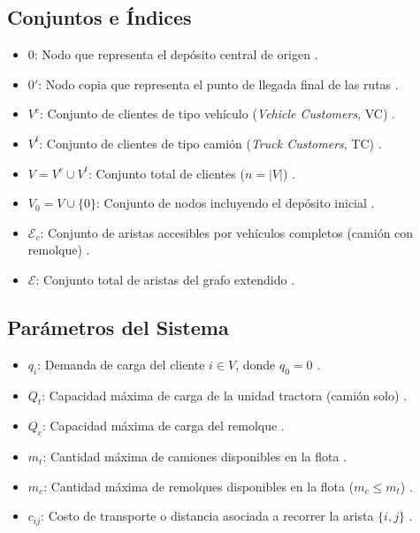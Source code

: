 \documentclass[letter, 10pt]{article}
\begin{document}
\subsection{Conjuntos e \'Indices}
\begin{itemize}
    \item $0$: Nodo que representa el dep\'osito central de origen \cite{bartolini2020two}.
    \item $0'$: Nodo copia que representa el punto de llegada final de las rutas \cite{bartolini2020two}.
    \item $V^c$: Conjunto de clientes de tipo veh\'iculo (\textit{Vehicle Customers}, VC) \cite{bartolini2020two}.
    \item $V^t$: Conjunto de clientes de tipo cami\'on (\textit{Truck Customers}, TC) \cite{bartolini2020two}.
    \item $V = V^c \cup V^t$: Conjunto total de clientes ($n = |V|$) \cite{bartolini2020two}.
    \item $V_0 = V \cup \{0\}$: Conjunto de nodos incluyendo el dep\'osito inicial \cite{bartolini2020two}.
    \item $\mathcal{E}_c$: Conjunto de aristas accesibles por veh\'iculos completos (cami\'on con remolque) \cite{bartolini2020two}.
    \item $\mathcal{E}$: Conjunto total de aristas del grafo extendido \cite{bartolini2020two}.
\end{itemize}

\subsection{Par\'ametros del Sistema}
\begin{itemize}
    \item $q_i$: Demanda de carga del cliente $i \in V$, donde $q_0 = 0$ \cite{bartolini2020two}.
    \item $Q_t$: Capacidad m\'axima de carga de la unidad tractora (cami\'on solo) \cite{bartolini2020two}.
    \item $Q_c$: Capacidad m\'axima de carga del remolque \cite{bartolini2020two}.
    \item $m_t$: Cantidad m\'axima de camiones disponibles en la flota \cite{bartolini2020two}.
    \item $m_c$: Cantidad m\'axima de remolques disponibles en la flota ($m_c \le m_t$) \cite{bartolini2020two}.
    \item $c_{ij}$: Costo de transporte o distancia asociada a recorrer la arista $\{i,j\}$ \cite{bartolini2020two}.
\end{itemize}
\end{document}
